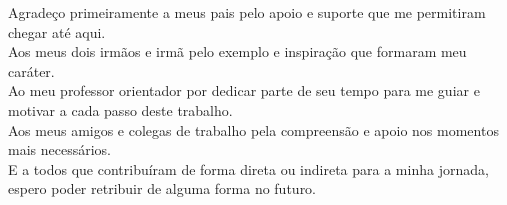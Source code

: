 Agradeço primeiramente a meus pais pelo apoio e suporte que me permitiram chegar até aqui.\\

\noindent
Aos meus dois irmãos e irmã pelo exemplo e inspiração que formaram meu caráter.\\

\noindent
Ao meu professor orientador por dedicar parte de seu tempo para me guiar e motivar a cada passo deste trabalho.\\

\noindent
Aos meus amigos e colegas de trabalho pela compreensão e apoio nos momentos mais necessários.\\

\noindent
E a todos que contribuíram de forma direta ou indireta para a minha jornada, espero poder retribuir de alguma forma no futuro.